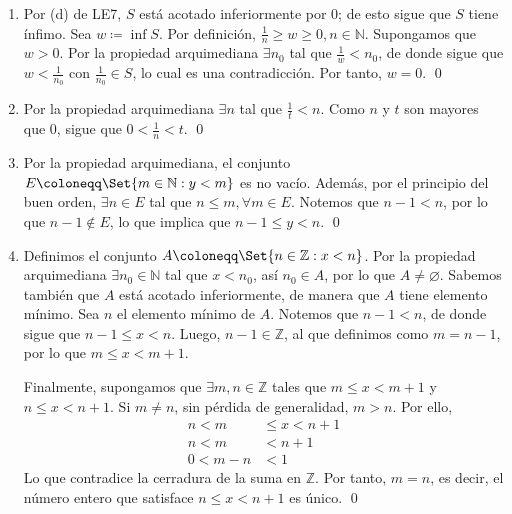 \documentclass[11pt]{article}
\newcommand{\N}{\mathbb{N}}
\newcommand{\Z}{\mathbb{Z}}
\let\emptyset\varnothing
\let\set\Set
\begin{document}
\begin{enumerate}[label=\alph*)]
    \item Por (d) de LE7, $S$ está acotado inferiormente por $0$; de esto sigue que $S$ tiene ínfimo. Sea $w\coloneqq \inf{S}$. Por definición, $\frac{1}{n}\geq w\geq 0, n\in \N$. Supongamos que $w>0$. Por la propiedad arquimediana $\exists n_0$ tal que $\frac{1}{w} < n_0$, de donde sigue que $w<\frac{1}{n_0}$ con $\frac{1}{n_0} \in S$, lo cual es una contradicción. Por tanto, $w=0$. \qed
    
    \item Por la propiedad arquimediana $\exists n$ tal que $\frac{1}{t}<n$. Como $n$ y $t$ son mayores que $0$, sigue que $0<\frac{1}{n}<t$. \qed
    
    \item Por la propiedad arquimediana, el conjunto $E\coloneqq \set{m\in \N: y<m}$ es no vacío. Además, por el principio del buen orden, $\exists n\in E$ tal que $n\leq m, \forall m\in E$. Notemos que $n-1<n$, por lo que $n-1\notin E$, lo que implica que $n-1\leq y<n$. \qed
    
    \item Definimos el conjunto $A\coloneqq \set{n\in \Z: x<n}$. Por la propiedad arquimediana $\exists n_0 \in \N$ tal que $x<n_0$, así $n_0\in A$, por lo que $A\neq \emptyset$. Sabemos también que $A$ está acotado inferiormente, de manera que $A$ tiene elemento mínimo. Sea $n$ el elemento mínimo de $A$. Notemos que $n-1<n$, de donde sigue que $n-1\leq x<n$. Luego, $n-1\in \Z$, al que definimos como $m=n-1$, por lo que $m\leq x<m+1$.
    
    Finalmente, supongamos que $\exists m, n\in \Z$ tales que $m\leq x<m+1$ y $n\leq x<n+1$. Si $m\neq n$, sin pérdida de generalidad, $m>n$. Por ello, \begin{align*}
        n < m &\leq x<n+1 \\
        n < m &<n+1 \\
        0 < m-n &<1
    \end{align*}  
    Lo que contradice la cerradura de la suma en $\Z$. Por tanto, $m=n$, es decir, el número entero que satisface $n\leq x<n+1$ es único. \qed
%    
%
\end{enumerate}
\end{document}
